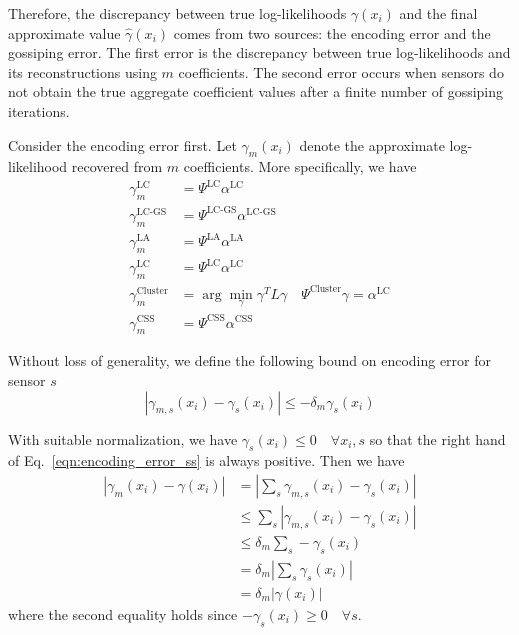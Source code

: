 \documentclass[10pt,letterpaper,final]{article}
\begin{document}
Therefore, the discrepancy between true log-likelihoods $\gamma(x_i)$ and the final approximate value $\hat{\gamma}(x_i)$ comes from two sources: the encoding error and the gossiping error. The first error is the discrepancy between true log-likelihoods and its reconstructions using $m$ coefficients. The second error occurs when sensors do not obtain the true aggregate coefficient values after a finite number of gossiping iterations. 

Consider the encoding error first. Let $\gamma_m(x_i)$ denote the approximate log-likelihood recovered from $m$ coefficients. More specifically, we have
\begin{align}
\gamma_m^{\text{LC}} &= \Psi^{\text{LC}}\alpha^{\text{LC}} \\
\gamma_m^{\text{LC-GS}} &= \Psi^{\text{LC-GS}}\alpha^{\text{LC-GS}} \\
\gamma_m^{\text{LA}} &= \Psi^{\text{LA}}\alpha^{\text{LA}} \\
\gamma_m^{\text{LC}} &= \Psi^{\text{LC}}\alpha^{\text{LC}} \\
\gamma_m^{\text{Cluster}} &= \arg \min_{\gamma} \gamma^T L \gamma \quad \Psi^{\text{Cluster}}\gamma = \alpha^{\text{LC}} \\
\gamma_m^{\text{CSS}} &= \Psi^{\text{CSS}}\alpha^{\text{CSS}}
\end{align}

Without loss of generality, we define the following bound on encoding error for sensor $s$
\begin{equation}
|\gamma_{m,s}(x_i) - \gamma_s(x_i)|\leq -\delta_m\gamma_s(x_i)
\label{eqn:encoding_error_ss}
\end{equation}

With suitable normalization, we have $\gamma_s(x_i)\leq 0 \quad \forall x_i, s$ so that the right hand of Eq.~\eqref{eqn:encoding_error_ss} is always positive. Then we have
\begin{align}
\left\vert\gamma_{m}(x_i) - \gamma(x_i)\right\vert &=
\left\vert\sum_s \gamma_{m,s}(x_i)-\gamma_s(x_i) \right\vert \nonumber \\
&\leq \sum_s\left\vert \gamma_{m,s}(x_i)-\gamma_s(x_i) \right\vert \nonumber \\
&\leq \delta_m\sum_s -\gamma_s(x_i) \nonumber\\
&= \delta_m \left\vert \sum_s \gamma_s(x_i)\right\vert \nonumber \\
&= \delta_m \left\vert \gamma(x_i)\right\vert
\label{eqn:encoding_error}
\end{align}
where the second equality holds since $-\gamma_s(x_i)\geq 0\quad \forall s$. 
\end{document}
